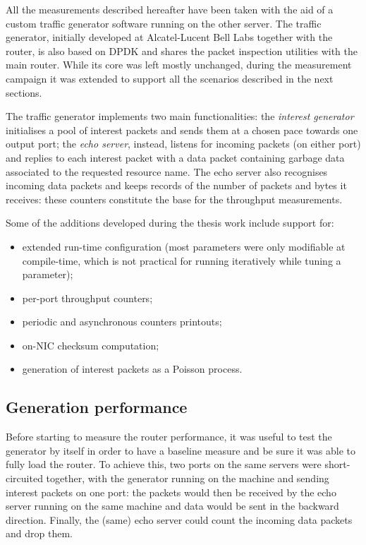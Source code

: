 \documentclass[11pt,a4paper,twoside,titlepage,openany]{book}
\begin{document}
All the measurements described hereafter have been taken with the aid of a custom traffic generator software running on the other server. The traffic generator, initially developed at Alcatel-Lucent Bell Labs together with the router, is also based on DPDK and shares the packet inspection utilities with the main router. While its core was left mostly unchanged, during the measurement campaign it was extended to support all the scenarios described in the next sections.

The traffic generator implements two main functionalities: the \emph{interest generator} initialises a pool of interest packets and sends them at a chosen pace towards one output port; the \emph{echo server}, instead, listens for incoming packets (on either port) and replies to each interest packet with a data packet containing garbage data associated to the requested resource name. The echo server also recognises incoming data packets and keeps records of the number of packets and bytes it receives: these counters constitute the base for the throughput measurements.

Some of the additions developed during the thesis work include support for:
\begin{itemize}[noitemsep,nolistsep]
  \item extended run-time configuration (most parameters were only modifiable at compile-time, which is not practical for running iteratively while tuning a parameter);
  \item per-port throughput counters;
  \item periodic and asynchronous counters printouts;
  \item on-NIC checksum computation;
  \item generation of interest packets as a Poisson process.
\end{itemize}

\subsection{Generation performance}

Before starting to measure the router performance, it was useful to test the generator by itself in order to have a baseline measure and be sure it was able to fully load the router.
To achieve this, two ports on the same servers were short-circuited together, with the generator running on the machine and sending interest packets on one port: the packets would then be received by the echo server running on the same machine and data would be sent in the backward direction. Finally, the (same) echo server could count the incoming data packets and drop them.
\end{document}
